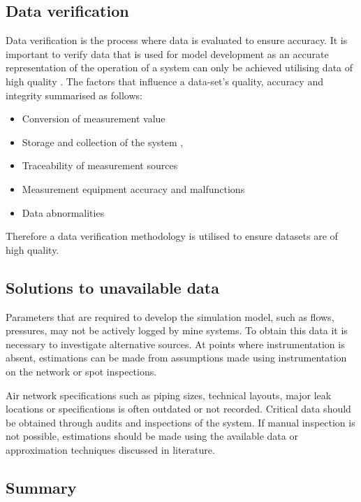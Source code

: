 	\subsection{Data verification}
	Data verification is the process where data is evaluated to ensure accuracy. It is important to verify data that is used for model development as an accurate representation of the operation of a system can only be achieved utilising data of high quality \cite{gous2016data}. The factors that influence a data-set's quality, accuracy and integrity  summarised as follows:
	\begin{itemize}
		\item Conversion of measurement value \cite{meijsen2015verification}
		\item Storage and collection of the system \cite{vanNiekerk2016quantification},\cite{Jansevan2016structuring}
		\item Traceability of measurement sources \cite{Jansevan2016structuring}
		\item Measurement equipment accuracy and malfunctions \cite{gous2016data}
		\item Data abnormalities \cite{gous2016data}
	\end{itemize} 
	\par 
	Therefore a data verification methodology is utilised to ensure datasets are of high quality. 
	\subsection{Solutions to unavailable data}
		Parameters that are required to develop the simulation model, such as flows, pressures, may not be actively logged by mine systems. To obtain this data it is necessary to investigate alternative sources. At points where instrumentation is absent, estimations can be made from assumptions made using instrumentation on the network or spot inspections.
		\par 
		Air network specifications such as piping sizes, technical layouts, major leak locations or specifications is often outdated or not recorded. Critical data should be obtained through audits and inspections of the system. If manual inspection is not possible, estimations should be made using the available data or approximation techniques discussed in literature. %
	
	\subsection{Summary}
\newpage	

